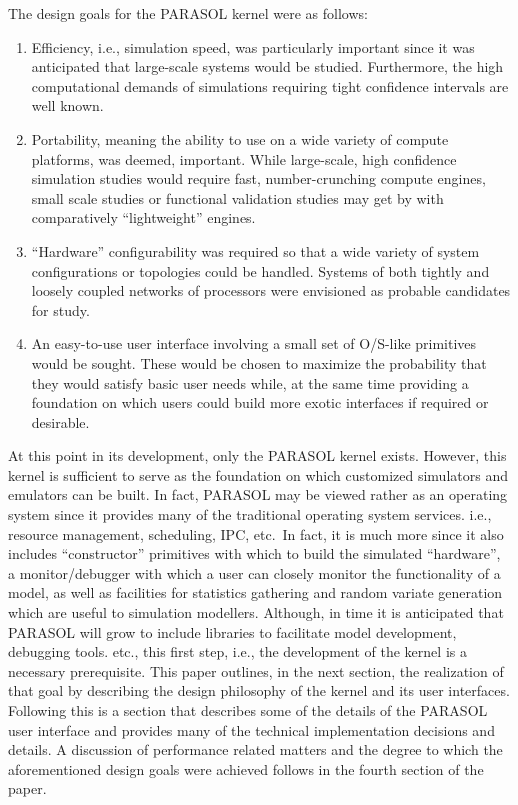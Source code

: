 \documentclass[11pt]{article}
\begin{document}
The design goals for the PARASOL kernel were as follows:
\begin{enumerate}
\item 
Efficiency, i.e., simulation speed, was particularly important since it
was anticipated that large-scale systems would be studied. Furthermore,
the high computational demands of simulations requiring tight
confidence intervals are well known.
\item Portability, meaning the ability to use on a wide variety of compute
platforms, was deemed, important. While large-scale, high confidence
simulation studies would require fast, number-crunching compute
engines, small scale studies or functional validation studies may get by
with comparatively ``lightweight'' engines.
\item ``Hardware'' configurability was required so that a wide variety of
system configurations or topologies could be handled. Systems of both
tightly and loosely coupled networks of processors were envisioned as
probable candidates for study.
\item An easy-to-use user interface involving a small set of O/S-like primitives
would be sought. These would be chosen to maximize the probability
that they would satisfy basic user needs while, at the same time
providing a foundation on which users could build more exotic
interfaces if required or desirable.
\end{enumerate}

At this point in its development, only the PARASOL kernel exists. However, this kernel is
sufficient to serve as the foundation on which customized simulators and emulators can be built.
In fact, PARASOL may be viewed rather as an operating system since it provides many of the
traditional operating system services. i.e., resource management, scheduling, IPC, etc.\ In fact, it
is much more since it also includes ``constructor'' primitives with which to build the simulated
``hardware'', a monitor/debugger with which a user can closely monitor the functionality of a
model, as well as facilities for statistics gathering and random variate generation which are useful
to simulation modellers. Although, in time it is anticipated that PARASOL will grow to include
libraries to facilitate model development, debugging tools. etc., this first step, i.e., the
development of the kernel is a necessary prerequisite. This paper outlines, in the next section, the
realization of that goal by describing the design philosophy of the kernel and its user interfaces.
Following this is a section that describes some of the details of the PARASOL user interface and
provides many of the technical implementation decisions and details. A discussion of performance
related matters and the degree to which the aforementioned design goals were achieved follows in
the fourth section of the paper.
\end{document}
